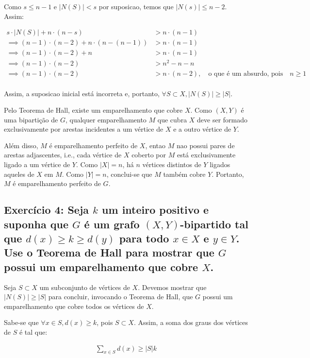 \documentclass{article}
\begin{document}
 Como  $s \leq n - 1$ e  $|N(S)| < s$ por suposicao, temos que $|N(s)| \leq n - 2$. Assim:
 
  \begin{align*}
 	s \cdot |N(S)| + n \cdot (n - s) &> n \cdot (n - 1) \\
 	\implies (n-1)\cdot (n-2) + n \cdot (n - (n-1)) &> n \cdot (n - 1) \\
 	 \implies (n-1)\cdot (n-2) + n &> n \cdot (n - 1) \\
 	\implies (n-1)\cdot (n-2) &> n^2 - n - n \\
 	 \implies (n-1)\cdot (n-2) &> n \cdot (n - 2), \quad \text{o que é um absurdo, pois} \quad n \geq 1\\
 \end{align*}
 
Assim, a suposicao inicial está incorreta e, portanto, $\forall S \subset X, |N(S)| \geq |S|$. 

Pelo Teorema de Hall, existe um emparelhamento que cobre $X$. Como $(X, Y)$ é uma bipartição de $G$, qualquer emparelhamento $M$ que cubra $X$ deve ser formado exclusivamente por arestas incidentes a um vértice de $X$ e a outro vértice de $Y$.

Além disso, $M$ é emparelhamento perfeito de $X$, entao $M$ nao possui pares de arestas adjascentes, i.e., cada vértice de $X$ coberto por $M$ está exclusivamente ligado a um vértice de $Y$. Como $|X| = n$, há $n$ vértices distintos de $Y$ ligados aqueles de $X$ em $M$. Como $|Y| = n$, conclui-se que $M$ também cobre $Y$. Portanto, $M$ é emparelhamento perfeito de $G$.

\clearpage

\subsection{Exercício 4:  Seja $k$ um inteiro positivo e suponha que $G$ é um grafo $(X,Y)$-bipartido tal que $d(x) \geq k \geq d(y)$ para todo $x \in X$ e $y \in Y$. Use o Teorema de Hall para mostrar que $G$ possui um emparelhamento que cobre $X$.}


Seja $S \subset X$ um subconjunto de vértices de $X$. Devemos mostrar que $|N(S)| \geq |S|$ para concluir, invocando o Teorema de Hall, que $G$ possui um emparelhamento que cobre todos os vértices de $X$.


Sabe-se que $\forall x \in S, d(x) \geq k$, pois $S \subset X$. Assim, a soma dos graus dos vértices de $S$ é tal que:

\begin{align}
 \sum_{x \in S} d(x) \geq |S|k \tag*{I} 
\end{align}
\end{document}
